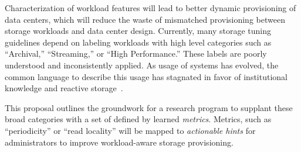 Characterization of workload                    
features will lead to better dynamic provisioning of data centers, which will                           
reduce the waste of mismatched provisioning between storage workloads and data
center design.  
Currently, many storage tuning guidelines depend on labeling workloads with high level categories such as ``Archival,'' ``Streaming,'' or ``High Performance.'' %
These labels are poorly
understood and inconsistently applied.  As usage of systems has evolved, the common
language to describe this usage has stagnated in favor of institutional knowledge and reactive storage~\cite{TK}.
%

This proposal outlines the groundwork for a research program to supplant these broad categories with a set of \mWs defined by learned \textit{metrics}.  Metrics, such as ``periodicity'' or ``read locality'' will be mapped to \textit{actionable hints} for administrators to improve workload-aware storage provisioning.
 


